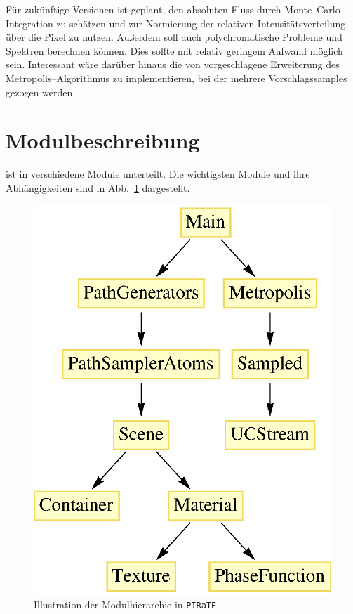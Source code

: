 	Für zukünftige Versionen ist geplant, den absoluten Fluss durch Monte--Carlo--Integration zu schätzen und zur Normierung der relativen Intensitätsverteilung über die Pixel zu nutzen. Außerdem soll \pirate auch polychromatische Probleme und Spektren berechnen können. Dies sollte mit relativ geringem Aufwand möglich sein. Interessant wäre darüber hinaus die von \citet{Liu:2000p8427} vorgeschlagene Erweiterung des Metropolis--Algorithmus zu implementieren, bei der mehrere Vorschlagssamples gezogen werden.
	
	\section{Modulbeschreibung}
	
	\pirate ist in verschiedene Module unterteilt. Die wichtigsten Module und ihre Ab\-hän\-gig\-kei\-ten sind in Abb.~\ref{fig:moduleoverview} dargestellt.
		\begin{figure}
				\centering
				\includegraphics[height=0.3\textheight]{moduleoverview.eps}
				\caption{Illustration der Modulhierarchie in \texttt{PIRaTE}.}
				\label{fig:moduleoverview}
		\end{figure}

